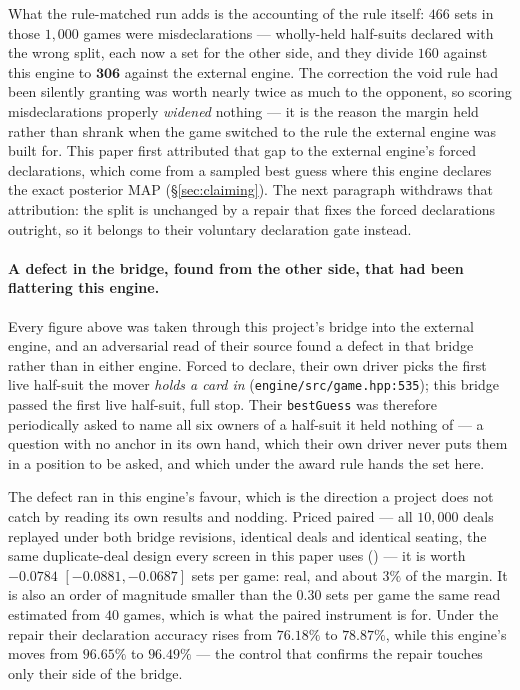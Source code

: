 \documentclass[11pt,letterpaper]{article}
\begin{document}
What the rule-matched run adds is the accounting of the rule itself: $466$
sets in those $1{,}000$ games were misdeclarations --- wholly-held
half-suits declared with the wrong split, each now a set for the other side,
and they divide $160$ against this engine to $\mathbf{306}$ against
the external engine. The correction the void rule had been silently granting was worth
nearly twice as much to the opponent, so scoring misdeclarations properly
\emph{widened} nothing --- it is the reason the margin held rather than
shrank when the game switched to the rule the external engine was built for. This paper
first attributed that gap to the external engine's forced declarations, which come from a
sampled best guess where this engine declares the exact posterior MAP
(\S\ref{sec:claiming}). The next paragraph withdraws that attribution: the
split is unchanged by a repair that fixes the forced declarations outright,
so it belongs to their voluntary declaration gate instead.

\paragraph{A defect in the bridge, found from the other side, that had been
flattering this engine.} Every figure above was taken through this project's
bridge into the external engine, and an adversarial read of their source
found a defect in that bridge rather than in either engine.
Forced to declare, their own driver picks the first live half-suit the mover
\emph{holds a card in} (\texttt{engine/src/game.hpp:535}); this bridge passed
the first live half-suit, full stop. Their \texttt{bestGuess} was therefore
periodically asked to name all six owners of a half-suit it held nothing of
--- a question with no anchor in its own hand, which their own driver never
puts them in a position to be asked, and which under the award rule hands
the set here.

The defect ran in this engine's favour, which is the direction a project does
not catch by reading its own results and nodding. Priced paired --- all
$10{,}000$ deals replayed under both bridge revisions, identical deals and
identical seating, the same duplicate-deal design every screen in this paper
uses () --- it is worth $\mathbf{-0.0784}$
$[-0.0881, -0.0687]$ sets per game: real, and about $3\%$ of the margin. It
is also an order of magnitude smaller than the $0.30$ sets per game the same
read estimated from $40$ games, which is what the paired instrument is for.
Under the repair their declaration accuracy rises from $76.18\%$ to
$78.87\%$, while this engine's moves from $96.65\%$ to $96.49\%$ --- the
control that confirms the repair touches only their side of the bridge.
\end{document}
